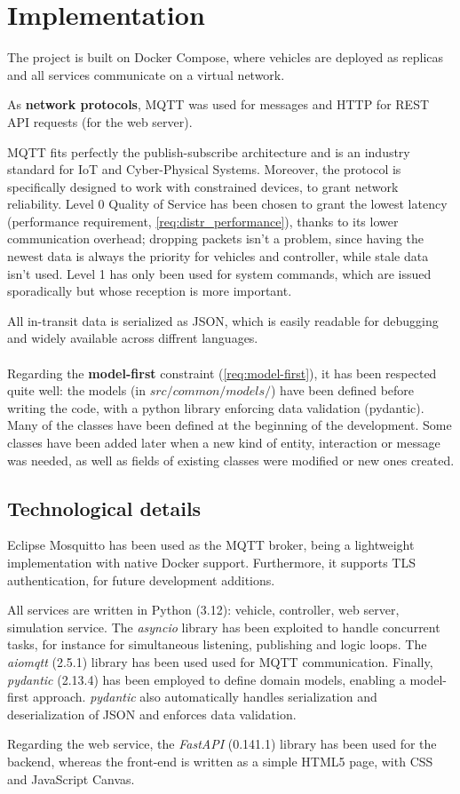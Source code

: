 \section{Implementation}\label{implementation}

The project is built on Docker Compose, where vehicles are deployed as replicas
and all services communicate on a virtual network.

As \textbf{network protocols}, MQTT was used for messages and HTTP for REST API
requests (for the web server).

MQTT fits perfectly the publish-subscribe architecture and is an industry
standard for IoT and Cyber-Physical Systems. Moreover, the protocol is
specifically designed to work with constrained devices, to grant network
reliability. Level 0 Quality of Service has been chosen to grant the lowest
latency (performance requirement, \ref{req:distr_performance}), thanks to its
lower communication overhead; dropping packets isn't a problem, since having the
newest data is always the priority for vehicles and controller, while stale data
isn't used. Level 1 has only been used for system commands, which are issued
sporadically but whose reception is more important.

All in-transit data is serialized as JSON, which is easily readable for
debugging and widely available across diffrent languages.
\\
\\
Regarding the \textbf{model-first} constraint (\ref{req:model-first}), it has
been respected quite well: the models (in $src/common/models/$) have been
defined before writing the code, with a python library enforcing data validation
(pydantic). Many of the classes have been defined at the beginning of the
development. Some classes have been added later when a new kind of entity,
interaction or message was needed, as well as fields of existing classes were
modified or new ones created.


\subsection{Technological details}\label{technological-details}

Eclipse Mosquitto has been used as the MQTT broker, being a lightweight
implementation with native Docker support. Furthermore, it supports TLS
authentication, for future development additions.

All services are written in Python (3.12): vehicle, controller, web server,
simulation service. The \textit{asyncio} library has been exploited to handle
concurrent tasks, for instance for simultaneous listening, publishing and logic
loops. The \textit{aiomqtt} (2.5.1) library has been used used for MQTT
communication. Finally, \textit{pydantic} (2.13.4) has been employed to define
domain models, enabling a model-first approach. \textit{pydantic} also
automatically handles serialization and deserialization of JSON and enforces
data validation.

Regarding the web service, the \textit{FastAPI} (0.141.1) library has been used
for the backend, whereas the front-end is written as a simple HTML5 page,
with CSS and JavaScript Canvas.
